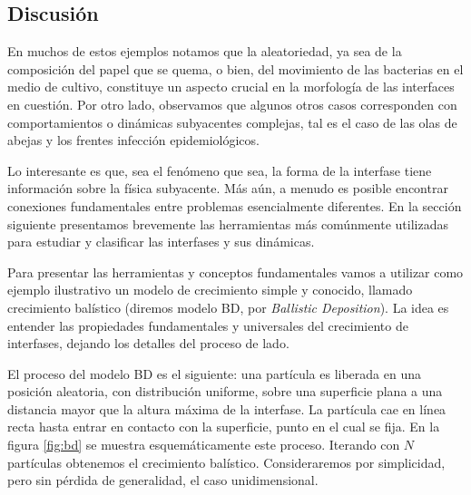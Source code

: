\subsection*{Discusión}

En muchos de estos ejemplos notamos que la aleatoriedad, ya sea de la composición del papel que se quema, o bien, del movimiento de las bacterias en el medio de cultivo,
constituye un aspecto crucial en la morfología de las interfaces en cuestión. Por otro lado, observamos que algunos otros casos corresponden con comportamientos o 
dinámicas subyacentes complejas, tal es el caso de las olas de abejas y los frentes infección epidemiológicos. 

Lo interesante es que, sea el fenómeno que sea, la forma de la interfase tiene información sobre la física subyacente. Más aún, a menudo es posible
encontrar conexiones fundamentales entre problemas esencialmente diferentes. En la sección siguiente presentamos brevemente las herramientas más comúnmente 
utilizadas para estudiar y clasificar las interfases y sus dinámicas. 


Para presentar las herramientas y conceptos fundamentales vamos a utilizar como ejemplo ilustrativo un modelo de crecimiento simple y conocido, llamado crecimiento balístico (diremos modelo BD, por \textit{Ballistic Deposition}). La idea es entender las propiedades fundamentales y universales del crecimiento de interfases, dejando los detalles del proceso de lado.

El proceso del modelo BD es el siguiente: una partícula es liberada en una posición aleatoria, con distribución uniforme, sobre una superficie 
plana a una distancia mayor que la altura máxima de la interfase. La partícula cae en línea recta hasta entrar en contacto con la superficie, punto en el 
cual se fija. En la figura \ref{fig:bd} se muestra esquemáticamente este proceso. Iterando con $N$ partículas obtenemos el crecimiento balístico. Consideraremos por simplicidad, pero sin pérdida de generalidad, el caso unidimensional.

